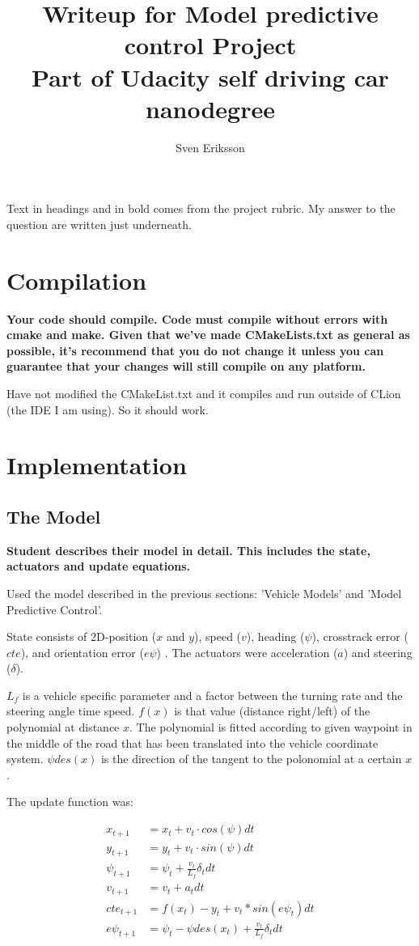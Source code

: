 \documentclass[12pt,a4paper]{article}
\author{Sven Eriksson}
\title{Writeup for Model predictive control Project \\ \large{Part of Udacity self driving car nanodegree}}
\begin{document}
\maketitle


Text in headings and in bold comes from the project rubric. My answer to the question are written just underneath.

\section{Compilation}
\textbf{Your code should compile. Code must compile without errors with cmake and make. Given that we've made CMakeLists.txt as general as possible, it's recommend that you do not change it unless you can guarantee that your changes will still compile on any platform.}

Have not modified the CMakeList.txt and it compiles and run outside of CLion (the IDE I am using). So it should work.



\section{Implementation}


\subsection{The Model}
\textbf{Student describes their model in detail. This includes the state, actuators and update equations.}

Used the model described in the previous sections: 'Vehicle Models' and 'Model Predictive Control'.

State consists of 2D-position ($x$ and $y$), speed ($v$), heading ($\psi$), crosstrack error ($cte$), and orientation error ($e\psi$) . The actuators were acceleration ($a$) and steering ($\delta$).

$L_f$ is a vehicle specific parameter and a factor between the turning rate and the steering angle time speed. $f(x)$ is that value (distance right/left) of the polynomial at distance $x$. The polynomial is fitted according to given waypoint in the middle of the road that has been translated into the vehicle coordinate system. $\psi des(x)$ is the direction of the tangent to the polonomial at a certain $x$.

The update function was:

\begin{align*}
x_{t+1} &= x_t + v_t \cdot cos(\psi) dt \\
y_{t+1} &= y_t + v_t \cdot sin(\psi) dt \\
\psi_{t+1} &= \psi_t + \frac{v_t}{L_f} \delta_t dt \\
v_{t+1} &= v_t + a_t dt \\
cte_{t+1} &= f(x_t) - y_t + v_t * sin(e\psi_t) dt \\
e\psi_{t+1} &= \psi_t - \psi des(x_t) + \frac{v_t}{L_f} \delta_t dt
\end{align*}
\end{document}
